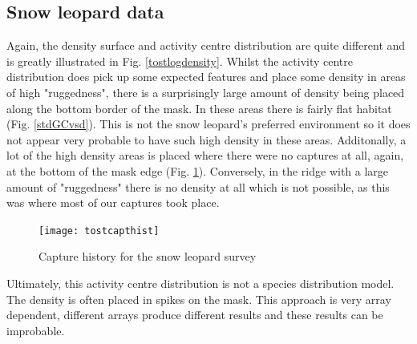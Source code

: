 \documentclass[a4paper,12pt]{article}
\begin{document}
\subsection{Snow leopard data}
Again, the density surface and activity centre distribution are quite different and is greatly illustrated in Fig. \ref{tostlogdensity}. Whilst the activity centre distribution does pick up some expected features and place some density in areas of high "ruggedness", there is a surprisingly large amount of density being placed along the bottom border of the mask. In these areas there is fairly flat habitat (Fig. \ref{stdGCvsd}). This is not the snow leopard's preferred environment so it does not appear very probable to have such high density in these areas. Additonally, a lot of the high density areas is placed where there were no captures at all, again, at the bottom of the mask edge (Fig. \ref{tostcapthist}). Conversely, in the ridge with a large amount of "ruggedness" there is no density at all which is not possible, as this was where most of our captures took place.

\begin{figure}[H]
\centering
\texttt{[image: tostcapthist]}
\caption{Capture history for the snow leopard survey}
\label{tostcapthist}
\end{figure}

Ultimately, this activity centre distribution is not a species distribution model. The density is often placed in spikes on the mask. This approach is very array dependent, different arrays produce different results and these results can be improbable.



\end{document}
